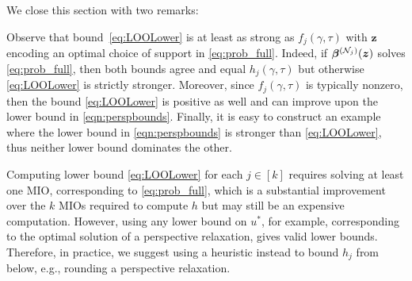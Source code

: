 \documentclass[ijoc,noblindrev]{informs3} %
\newcommand{\ag}[1]{{\color{black}#1}}
\begin{document}
\endproof
We close this section with two remarks:
\begin{remark}
Observe that bound~\eqref{eq:LOOLower} is at least as strong as $f_j(\gamma, \tau)$ with $\bm{z}$ encoding an optimal choice of support in \eqref{eq:prob_full}. Indeed, if $\bm{\beta}^{(\ag{\mathcal{N}_j})}(\bm{z})$ solves \eqref{eq:prob_full}, then both bounds agree and equal $h_j(\gamma, \tau)$ but otherwise \eqref{eq:LOOLower} is strictly stronger. Moreover, since $f_j(\gamma, \tau)$ is typically nonzero, then the bound \eqref{eq:LOOLower} is positive as well and can improve upon the lower bound in \eqref{eqn:perspbounds}. Finally, it is easy to construct an example where the lower bound in \eqref{eqn:perspbounds} is stronger than \eqref{eq:LOOLower}, thus neither lower bound dominates the other.
\end{remark}
\begin{remark}
	Computing lower bound \eqref{eq:LOOLower} for each \ag{$j\in [k]$} requires solving at least one MIO, corresponding to \eqref{eq:prob_full}, which is a substantial improvement over the \ag{$k$} MIOs required to compute $h$ but may still be an expensive computation. However, using any lower bound on $u^*$, for example, corresponding to the optimal solution of a perspective relaxation, gives valid lower bounds. Therefore, in practice, we suggest using a heuristic instead to bound $h_j$ from below, e.g., rounding a perspective relaxation.
\end{remark}

\end{document}
